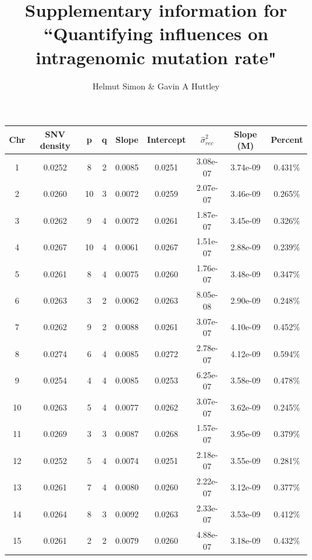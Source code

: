 \documentclass[12pt]{article}%
\title{Supplementary information for ``Quantifying influences on intragenomic mutation rate"}
\author{Helmut Simon \& Gavin A Huttley}
\begin{document}
\maketitle

\newpage

\begin{table}[htp!]
\centering
\begin{tabular}{ c c c c c c c c c }
\hline
\bf{Chr} & \bf{SNV density} & \bf{p} & \bf{q} & \bf{Slope} & \bf{Intercept} & \bf{$\hat{\sigma }^2_{rec}$} & \bf{Slope (M)} & \bf{Percent} \\
\hline
\hline
  1 &      0.0252 &  8 & 2 & 0.0085 &    0.0251 &                3.08e-07 &  3.74e-09 & 0.431\% \\
  2 &      0.0260 & 10 & 3 & 0.0072 &    0.0259 &                2.07e-07 &  3.46e-09 & 0.265\% \\
  3 &      0.0262 &  9 & 4 & 0.0072 &    0.0261 &                1.87e-07 &  3.45e-09 & 0.326\% \\
  4 &      0.0267 & 10 & 4 & 0.0061 &    0.0267 &                1.51e-07 &  2.88e-09 & 0.239\% \\
  5 &      0.0261 &  8 & 4 & 0.0075 &    0.0260 &                1.76e-07 &  3.48e-09 & 0.347\% \\
  6 &      0.0263 &  3 & 2 & 0.0062 &    0.0263 &                8.05e-08 &  2.90e-09 & 0.248\% \\
  7 &      0.0262 &  9 & 2 & 0.0088 &    0.0261 &                3.07e-07 &  4.10e-09 & 0.452\% \\
  8 &      0.0274 &  6 & 4 & 0.0085 &    0.0272 &                2.78e-07 &  4.12e-09 & 0.594\% \\
  9 &      0.0254 &  4 & 4 & 0.0085 &    0.0253 &                6.25e-07 &  3.58e-09 & 0.478\% \\
 10 &      0.0263 &  5 & 4 & 0.0077 &    0.0262 &                3.07e-07 &  3.62e-09 & 0.245\% \\
 11 &      0.0269 &  3 & 3 & 0.0087 &    0.0268 &                1.57e-07 &  3.95e-09 & 0.379\% \\
 12 &      0.0252 &  5 & 4 & 0.0074 &    0.0251 &                2.18e-07 &  3.55e-09 & 0.281\% \\
 13 &      0.0261 &  7 & 4 & 0.0080 &    0.0260 &                2.22e-07 &  3.12e-09 & 0.377\% \\
 14 &      0.0264 &  8 & 3 & 0.0092 &    0.0263 &                2.33e-07 &  3.53e-09 & 0.412\% \\
 15 &      0.0261 &  2 & 2 & 0.0079 &    0.0260 &                4.88e-07 &  3.18e-09 & 0.432\% \\

\end{tabular}
\end{table}
\end{document}
